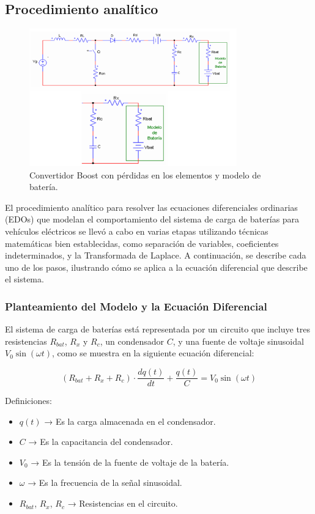 \subsection{Procedimiento analítico}
\begin{figure}[h]
    \centering
    \includegraphics[width=0.8\textwidth]{4.png} %
    \caption{Convertidor Boost con pérdidas en los elementos y modelo de batería.}
    \label{fig:procedimiento}
\end{figure}

El procedimiento analítico para resolver las ecuaciones diferenciales ordinarias (EDOs) que modelan
el comportamiento del sistema de carga de baterías para vehículos eléctricos se llevó a cabo en varias
etapas utilizando técnicas matemáticas bien establecidas, como separación de variables, coeficientes
indeterminados, y la Transformada de Laplace. A continuación, se describe cada uno de los pasos,
ilustrando cómo se aplica a la ecuación diferencial que describe el sistema.

\subsubsection*{Planteamiento del Modelo y la Ecuación Diferencial}
El sistema de carga de baterías está representada por un circuito que incluye tres resistencias
\(R_{bat}\), \(R_x\) y \(R_c\), un condensador \(C\), y una fuente de voltaje sinusoidal \(V_0 \sin(\omega t)\), como se
muestra en la siguiente ecuación diferencial:

\[
    (R_{bat} + R_x + R_c) \cdot \frac{dq(t)}{dt} + \frac{q(t)}{C} = V_0 \sin(\omega t)
\]

Definiciones:
\begin{itemize}
    \item \(q(t)\) → Es la carga almacenada en el condensador.
    \item \(C\) → Es la capacitancia del condensador.
    \item \(V_0\) → Es la tensión de la fuente de voltaje de la batería.
    \item \(\omega\) → Es la frecuencia de la señal sinusoidal.
    \item \(R_{bat}\), \(R_x\), \(R_c\) → Resistencias en el circuito.
\end{itemize}

